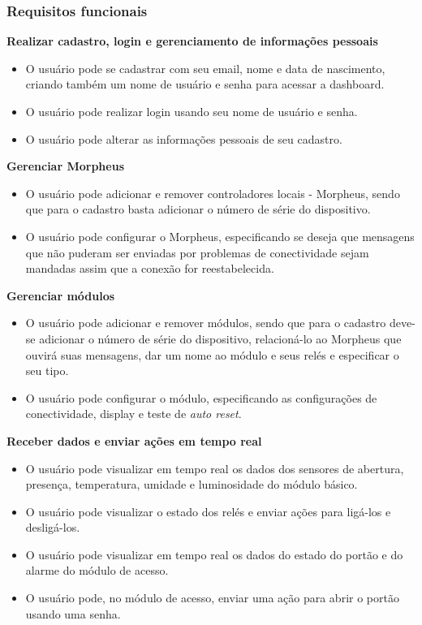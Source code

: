 \subsubsection{Requisitos funcionais}
\begin{description}

\item \textbf{Realizar cadastro, login e gerenciamento de informações pessoais}

\begin{itemize}
\item O usuário pode se cadastrar com seu email, nome e data de nascimento, criando também um nome de usuário e senha para acessar a dashboard.
\item O usuário pode realizar login usando seu nome de usuário e senha.
\item O usuário pode alterar as informações pessoais de seu cadastro.
\end{itemize}

\item \textbf{Gerenciar Morpheus}

\begin{itemize}
\item O usuário pode adicionar e remover controladores locais - Morpheus, sendo que para o cadastro basta adicionar o número de série do dispositivo.
\item O usuário pode configurar o Morpheus, especificando se deseja que mensagens que não puderam ser enviadas por problemas de conectividade sejam mandadas assim que a conexão for reestabelecida.
\end{itemize}

\item \textbf{Gerenciar módulos}

\begin{itemize}
\item O usuário pode adicionar e remover módulos, sendo que para o cadastro deve-se adicionar o número de série do dispositivo, relacioná-lo ao Morpheus que ouvirá suas mensagens, dar um nome ao módulo e seus relés e especificar o seu tipo.
\item O usuário pode configurar o módulo, especificando as configurações de conectividade, display e teste de \emph{auto reset}.
\end{itemize}

\item \textbf{Receber dados e enviar ações em tempo real}

\begin{itemize}
\item O usuário pode visualizar em tempo real os dados dos sensores de abertura, presença, temperatura, umidade e luminosidade do módulo básico.
\item O usuário pode visualizar o estado dos relés e enviar ações para ligá-los e desligá-los.
\item O usuário pode visualizar em tempo real os dados do estado do portão e do alarme do módulo de acesso.
\item O usuário pode, no módulo de acesso, enviar uma ação para abrir o portão usando uma senha.
\end{itemize}


\end{description}
